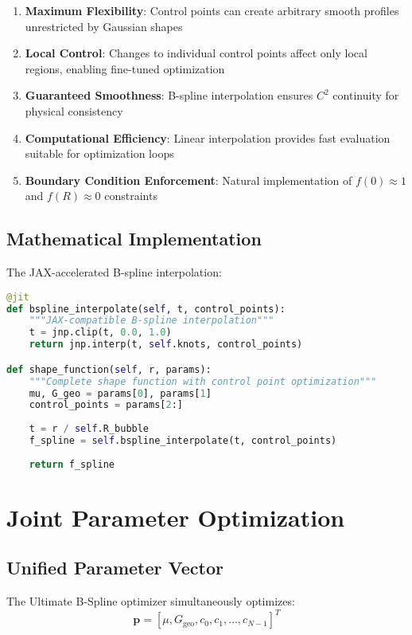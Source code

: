 \documentclass[11pt,a4paper]{article}
\begin{document}
\begin{enumerate}
\item \textbf{Maximum Flexibility}: Control points can create arbitrary smooth profiles unrestricted by Gaussian shapes
\item \textbf{Local Control}: Changes to individual control points affect only local regions, enabling fine-tuned optimization
\item \textbf{Guaranteed Smoothness}: B-spline interpolation ensures $C^2$ continuity for physical consistency
\item \textbf{Computational Efficiency}: Linear interpolation provides fast evaluation suitable for optimization loops
\item \textbf{Boundary Condition Enforcement}: Natural implementation of $f(0) \approx 1$ and $f(R) \approx 0$ constraints
\end{enumerate}

\subsection{Mathematical Implementation}

The JAX-accelerated B-spline interpolation:

\begin{lstlisting}[language=Python, caption=Ultimate B-Spline Implementation]
@jit
def bspline_interpolate(self, t, control_points):
    """JAX-compatible B-spline interpolation"""
    t = jnp.clip(t, 0.0, 1.0)
    return jnp.interp(t, self.knots, control_points)

def shape_function(self, r, params):
    """Complete shape function with control point optimization"""
    mu, G_geo = params[0], params[1]
    control_points = params[2:]
    
    t = r / self.R_bubble
    f_spline = self.bspline_interpolate(t, control_points)
    
    return f_spline
\end{lstlisting}

\section{Joint Parameter Optimization}

\subsection{Unified Parameter Vector}

The Ultimate B-Spline optimizer simultaneously optimizes:
\begin{equation}
\mathbf{p} = [\mu, G_{\text{geo}}, c_0, c_1, \ldots, c_{N-1}]^T
\end{equation}
\end{document}
